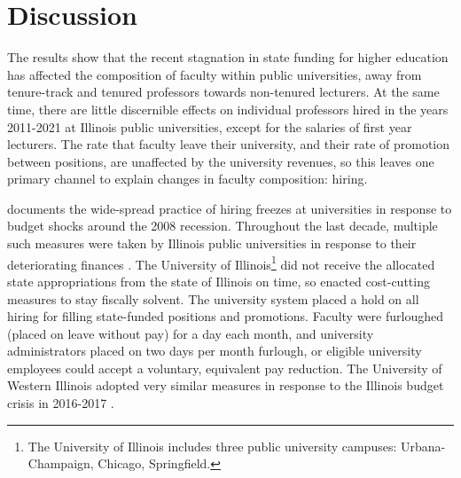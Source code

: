 \section{Discussion}

The results show that the recent stagnation in state funding for higher education has affected the composition of faculty within public universities, away from tenure-track and tenured professors towards non-tenured lecturers.
At the same time, there are little discernible effects on individual professors hired in the years 2011-2021 at Illinois public universities, except for the salaries of first year lecturers.
The rate that faculty leave their university, and their rate of promotion between positions, are unaffected by the university revenues, so this leaves one primary channel to explain changes in faculty composition: hiring.

\cite{turner2014impact} documents the wide-spread practice of hiring freezes at universities in response to budget shocks around the 2008 recession.
Throughout the last decade, multiple such measures were taken by Illinois public universities in response to their deteriorating finances \citep{furlough2010}.
The University of Illinois\footnote{
    The University of Illinois includes three public university campuses: Urbana-Champaign, Chicago, Springfield.
}
did not receive the allocated state appropriations from the state of Illinois on time, so enacted cost-cutting measures to stay fiscally solvent.
The university system placed a hold on all hiring for filling state-funded positions and promotions.
Faculty were furloughed (placed on leave without pay) for a day each month, and university administrators placed on two days per month furlough, or eligible university employees could accept a voluntary, equivalent pay reduction.
The University of Western Illinois adopted very similar measures in response to the Illinois budget crisis in 2016-2017 \citep{wiu2016}.

